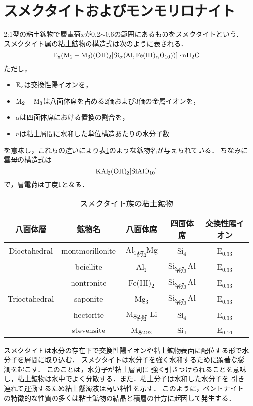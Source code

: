 \section{スメクタイトおよびモンモリロナイト}
2:1型の粘土鉱物で層電荷$x$が0.2$\sim$0.6の範囲にあるものをスメクタイトという．
スメクタイト属の粘土鉱物の構造式は次のように表される．
\[
	\rm 
	E_x(M_2-M_3)(OH)_2
	[ Si_\alpha (Al,Fe(III)_\alpha O_{10}))]
	\cdot nH_2O
\]
ただし，
\begin{itemize}
\item 
	$\rm E_x$は交換性陽イオンを，
\item
	$\rm M_2-M_3$は八面体席を占める2価および3価の金属イオンを，
\item
	$\alpha$は四面体席における置換の割合を，
\item
	$n$は粘土層間に水和した単位構造あたりの水分子数
\end{itemize}
を意味し，これらの違いにより表\ref{tbl:smectite}のような鉱物名が与えられている．
ちなみに雲母の構造式は
\[
	\rm KAl_2(OH)_2[SiAlO_{10}]
\]
で，層電荷は丁度1となる．
\begin{table}[h]
\begin{center}
	\caption{スメクタイト族の粘土鉱物}
\begin{tabular}{c|c|c|c|c}
	\hline \hline 
	八面体層 & 鉱物名 & 八面体席 & 四面体席 & 交換性陽イオン \\
	\hline 
	Dioctahedral & montmorillonite & Al$_{1.67}$-Mg$_{0.33}$ & Si$_4$ & E$_{0.33}$ \\
		& beiellite & Al$_{2}$ & Si$_{3.67}$-Al$_{0.33}$ & E$_{0.33}$ \\
		& nontronite & Fe(III)$_{2}$ & Si$_{3.67}$-Al$_{0.33}$ & E$_{0.33}$ \\
	\hline
	Trioctahedral & saponite & Mg$_{3}$ & Si$_{3.67}$-Al$_{0.33}$ & E$_{0.33}$ \\
	 & hectorite & Mg$_{2.67}$-Li$_{0.33}$ & Si$_{4}$ & E$_{0.33}$ \\
	 & stevensite & Mg$_{2.92}$ & Si$_{4}$ & E$_{0.16}$ \\
\hline  \hline
\end{tabular}
	\label{tbl:smectite}
\end{center}
\end{table}
スメクタイトは水分の存在下で交換性陽イオンや粘土鉱物表面に配位する形で水分子を層間に取り込む．
スメクタイトは水分子を強く水和するために顕著な膨潤を起こす\cite{Watanabe,Morodome,Sato}．
このことは，水分子が粘土層間に
強く引きつけられることを意味し，粘土鉱物は水中でよく分散する．また．粘土分子は水和した水分子を
引き連れて運動するため粘土懸濁液は高い粘性を示す．
このように，ベントナイトの特徴的な性質の多くは粘土鉱物の結晶と積層の仕方に起因して発生する．


